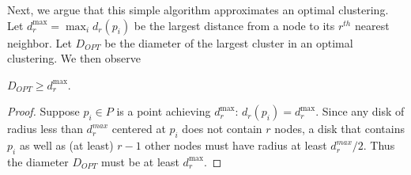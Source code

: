 

Next, we argue that this simple algorithm approximates an optimal clustering. Let $d_{r}^{\max} = \max_{i}{d_{r}(p_{i})}$ be the largest distance from a node to its $r^{th}$ nearest neighbor. Let $D_{OPT}$ be the diameter of the largest cluster in an optimal clustering.  We then observe

\begin{observation}
$D_{OPT}\geq d_{r}^{\max}$.
\end{observation}
\begin{proof}
Suppose $p_{i}\in P$ is a point achieving $d_{r}^{\max}$: $d_{r}(p_{i}) = d_{r}^{\max}$. Since any disk of radius less than $d_{r}^{max}$ centered at $p_{i}$ does not contain $r$ nodes, a disk that contains $p_{i}$ as well as (at least) $r-1$ other nodes must have radius at least $d_{r}^{max}/2$. Thus the diameter $D_{OPT}$ must be at least $d_{r}^{\max}$.
\end{proof}


